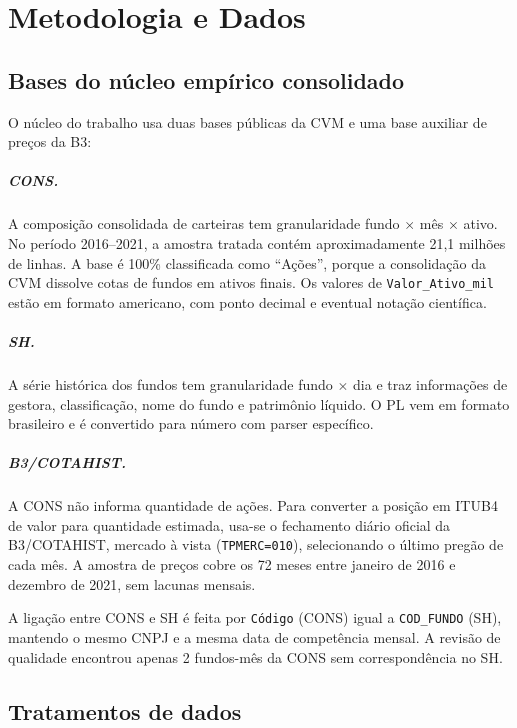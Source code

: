 \documentclass[12pt,a4paper]{report}
\begin{document}
\chapter{Metodologia e Dados}

\section{Bases do núcleo empírico consolidado}

O núcleo do trabalho usa duas bases públicas da CVM e uma base auxiliar de preços da B3:

\paragraph{CONS.} A composição consolidada de carteiras tem granularidade fundo $\times$ mês $\times$ ativo.
No período 2016--2021, a amostra tratada contém aproximadamente 21,1 milhões de linhas. A base é 100\%
classificada como ``Ações'', porque a consolidação da CVM dissolve cotas de fundos em ativos finais. Os
valores de \texttt{Valor\_Ativo\_mil} estão em formato americano, com ponto decimal e eventual notação
científica.

\paragraph{SH.} A série histórica dos fundos tem granularidade fundo $\times$ dia e traz informações de
gestora, classificação, nome do fundo e patrimônio líquido. O PL vem em formato brasileiro e é convertido
para número com parser específico.

\paragraph{B3/COTAHIST.} A CONS não informa quantidade de ações. Para converter a posição em ITUB4 de valor
para quantidade estimada, usa-se o fechamento diário oficial da B3/COTAHIST, mercado à vista
(\texttt{TPMERC=010}), selecionando o último pregão de cada mês. A amostra de preços cobre os 72 meses entre
janeiro de 2016 e dezembro de 2021, sem lacunas mensais.

A ligação entre CONS e SH é feita por \texttt{Código} (CONS) igual a \texttt{COD\_FUNDO} (SH), mantendo o
mesmo CNPJ e a mesma data de competência mensal. A revisão de qualidade encontrou apenas 2 fundos-mês da
CONS sem correspondência no SH.

\section{Tratamentos de dados}
\end{document}
